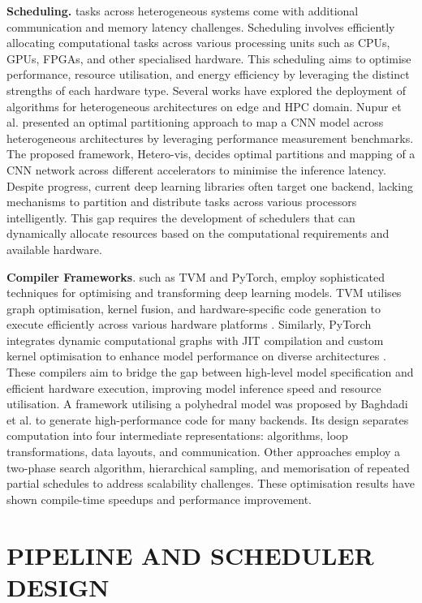 \documentclass[]{spie}  %
\begin{document}
\noindent\textbf{Scheduling.} tasks across heterogeneous systems come with additional communication and memory latency challenges. Scheduling involves efficiently allocating computational tasks across various processing units such as CPUs, GPUs, FPGAs, and other specialised hardware. This scheduling aims to optimise performance, resource utilisation, and energy efficiency by leveraging the distinct strengths of each hardware type. Several works have explored the deployment of algorithms for heterogeneous architectures on edge and HPC domain\cite{KheHardMue24,RatGouHog23}.  Nupur et al. \cite{SumRaw22} presented an optimal partitioning approach to map a CNN model across heterogeneous architectures by leveraging performance measurement benchmarks. The proposed framework, Hetero-vis, decides optimal partitions and mapping of a CNN network across different accelerators to minimise the inference latency. Despite progress, current deep learning libraries often target one backend, lacking mechanisms to partition and distribute tasks across various processors intelligently. This gap requires the development of schedulers that can dynamically allocate resources based on the computational requirements and available hardware\cite{KanLeeKil21, LanBhaSou2016}.

\noindent\textbf{Compiler Frameworks}. such as TVM and PyTorch, employ sophisticated techniques for optimising and transforming deep learning models. TVM utilises graph optimisation, kernel fusion, and hardware-specific code generation to execute efficiently across various hardware platforms \cite{chen2018}. Similarly, PyTorch integrates dynamic computational graphs with JIT compilation and custom kernel optimisation to enhance model performance on diverse architectures \cite{Pytorch}. These compilers aim to bridge the gap between high-level model specification and efficient hardware execution, improving model inference speed and resource utilisation. A framework utilising a polyhedral model was proposed by Baghdadi et al.\cite{BagRiyRay19} to generate high-performance code for many backends. Its design separates computation into four intermediate representations: algorithms, loop transformations, data layouts, and communication. Other approaches employ a two-phase search algorithm, hierarchical sampling, and memorisation of repeated partial schedules to address scalability challenges. These optimisation results have shown compile-time speedups and performance improvement\cite{Halide2018}.


\section{PIPELINE AND SCHEDULER DESIGN}
\label{sec:methodology}
\end{document}
